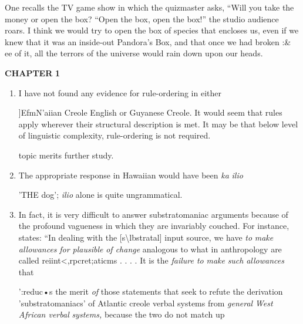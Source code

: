 One recalls the TV game show in which the quizmaster asks, ``Will you take the money or open the box?{\textquotedbl} ``Open the box, open the box!'' the studio audience roars. I think we would try to open the box of species that encloses us, even if we knew that it was an inside-out Pandora's Box, and that once we had broken :\& ee of it, all the terrors of the universe would rain down upon our heads.




\textbf{CHAPTER} \textbf{1}


\begin{enumerate}
\item I have not found any evidence for rule-ordering in either 

]EfmN'aiian Creole English or Guyanese Creole. It would seem that rules apply wherever their structural description is met. It may be that below level of linguistic complexity, rule-ordering is not required.

topic merits further study.
 
\item The appropriate response in Hawaiian would have been \textit{ka} \textit{ilio} 

'THE dog'; \textit{ilio} alone is quite ungrammatical.
 
\item In fact, it is very difficult to answer substratomaniac argu\-ments because of the profound vagueness in which they are invariably couched. For instance, \citet{Alleyne1979} states: ``In dealing with the [s{\textbackslash}lbstratal] input source, we have \textit{to} \textit{make allowances} \textit{for plausible} \textit{of change }analogous to what in anthropology are called reiint{\textless},rpcret;aticms . . . . It is the \textit{failure to} \textit{make} \textit{such} \textit{allowances} that
 

':reduc•s the merit \textit{of} those statements that seek to refute the derivation 'substratomaniacs' of Atlantic creole verbal systems from \textit{general\-} \textit{West} \textit{African verbal} \textit{systems,} because the two do not match up


\end{enumerate}
